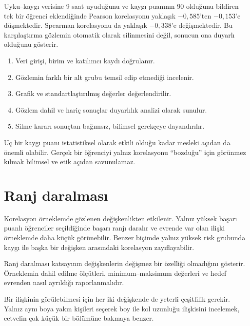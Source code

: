 Uyku--kaygı verisine 9 saat uyuduğunu ve kaygı puanının 90 olduğunu bildiren
tek bir öğrenci eklendiğinde Pearson korelasyonu yaklaşık $-0{,}585$'ten
$-0{,}153$'e düşmektedir. Spearman korelasyonu da yaklaşık $-0{,}338$'e
değişmektedir. Bu karşılaştırma gözlemin otomatik olarak silinmesini değil,
sonucun ona duyarlı olduğunu gösterir.

\begin{enumerate}
  \item Veri girişi, birim ve katılımcı kaydı doğrulanır.
  \item Gözlemin farklı bir alt grubu temsil edip etmediği incelenir.
  \item Grafik ve standartlaştırılmış değerler değerlendirilir.
  \item Gözlem dahil ve hariç sonuçlar duyarlılık analizi olarak sunulur.
  \item Silme kararı sonuçtan bağımsız, bilimsel gerekçeye dayandırılır.
\end{enumerate}

\begin{researchbox}
Uç bir kaygı puanı istatistiksel olarak etkili olduğu kadar mesleki açıdan da
önemli olabilir. Gerçek bir öğrenciyi yalnız korelasyonu ``bozduğu'' için
görünmez kılmak bilimsel ve etik açıdan savunulamaz.
\end{researchbox}

\section{Ranj daralması}

Korelasyon örneklemde gözlenen değişkenlikten etkilenir. Yalnız yüksek başarı
puanlı öğrenciler seçildiğinde başarı ranjı daralır ve evrende var olan ilişki
örneklemde daha küçük görünebilir. Benzer biçimde yalnız yüksek risk grubunda
kaygı ile başka bir değişken arasındaki korelasyon zayıflayabilir.

Ranj daralması katsayının değişkenlerin değişmez bir özelliği olmadığını
gösterir. Örneklemin dahil edilme ölçütleri, minimum--maksimum değerleri ve
hedef evrenden nasıl ayrıldığı raporlanmalıdır.

\begin{sezgibox}
Bir ilişkinin görülebilmesi için her iki değişkende de yeterli çeşitlilik
gerekir. Yalnız aynı boya yakın kişileri seçerek boy ile kol uzunluğu
ilişkisini incelemek, cetvelin çok küçük bir bölümüne bakmaya benzer.
\end{sezgibox}


